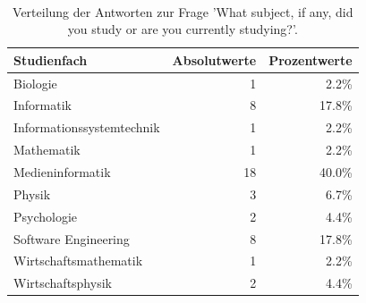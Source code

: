 \begin{table}
	\caption{Verteilung der Antworten zur Frage 'What subject, if any, did you study or are you currently studying?'.}~\label{tab:sc_results_age}
	
	\setlength\tabcolsep{3pt}
	\renewcommand{\arraystretch}{1.4}%
	\begin{tabularx}{\textwidth}{ | x || r | r | }
		\hline
		Studienfach & Absolutwerte & Prozentwerte \\ \hline\hline
		Biologie & 1 & 2.2\% \\ \hline
		Informatik & 8 & 17.8\% \\ \hline
		Informationssystemtechnik & 1 & 2.2\% \\ \hline
		Mathematik & 1 & 2.2\% \\ \hline
		Medieninformatik & 18 & 40.0\% \\ \hline
		Physik & 3 & 6.7\% \\ \hline
		Psychologie & 2 & 4.4\% \\ \hline
		Software Engineering & 8 & 17.8\% \\ \hline
		Wirtschaftsmathematik & 1 & 2.2\% \\ \hline
		Wirtschaftsphysik & 2 & 4.4\% \\ \hline
	\end{tabularx}
\end{table}


